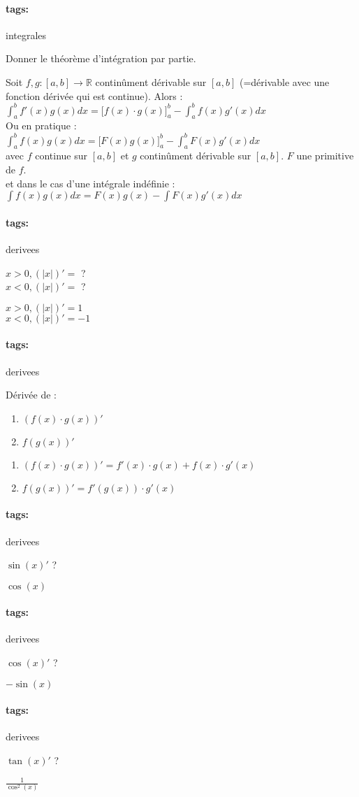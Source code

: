 \documentclass[12pt]{article}
\newcommand*{\xfield}[1]{\begin{mdframed}\centering #1\end{mdframed}\bigskip}
\newenvironment{note}{}{}
\newcommand*{\tags}[1]{\paragraph{tags: }#1}
\begin{document}
\begin{note}
\begin{note}
	\tags{integrales}
	\xfield{Donner le théorème d'intégration par partie.}
	\xfield{Soit $f,g : [a,b] \to \mathbb{R}$ continûment dérivable sur $[a,b]$ (=dérivable avec une fonction dérivée qui est continue). Alors :\\
	$\int_a^b f'(x)g(x) dx = \big[f(x)\cdot g(x)\big]_a^b - \int_a^b f(x)g'(x) dx$\\
	Ou en pratique :\\
	$\int_a^b f(x)g(x) dx = \big[ F(x) g(x)\big]_a^b - \int_a^b F(x) g'(x) dx$\\
	avec $f$ continue sur $[a,b]$ et $g$ continûment dérivable sur $[a,b]$. $F$ une primitive de $f$.\\
	et dans le cas d'une intégrale indéfinie :\\
	$\int f(x)g(x) dx = F(x)g(x) - \int F(x)g'(x) dx$ }
\end{note}
\begin{note}
	\tags{derivees}
	\xfield{$x>0, (\vert x\vert )' = $ ?\\
			$x<0, (\vert x\vert )' = $ ? }
	\xfield{$x>0, (\vert x\vert )' = 1$\\
			$x<0, (\vert x\vert )' = -1$}
\end{note}

\begin{note}
	\tags{derivees}
	\xfield{Dérivée de :
	\begin{enumerate}
		\item $(f(x)\cdot g(x))'$
		\item $f(g(x))'$
\end{enumerate}	}
	\xfield{\begin{enumerate}
		\item $(f(x)\cdot g(x))' =  f'(x)\cdot g(x) + f(x)\cdot g'(x)$
		\item $f(g(x))' = f'(g(x))\cdot g'(x)$
	\end{enumerate} }
\end{note}

\begin{note}
	\tags{derivees}
	\xfield{$\sin(x)'$ ?}
	\xfield{$\cos(x)$}
\end{note}

\begin{note}
	\tags{derivees}
	\xfield{$\cos(x)'$ ?}
	\xfield{$-\sin(x)$}
\end{note}

\begin{note}
	\tags{derivees}
	\xfield{$\tan(x)'$ ?}
	\xfield{$\frac{1}{\cos^2(x)}$}
\end{note}


\end{note}
\end{document}
